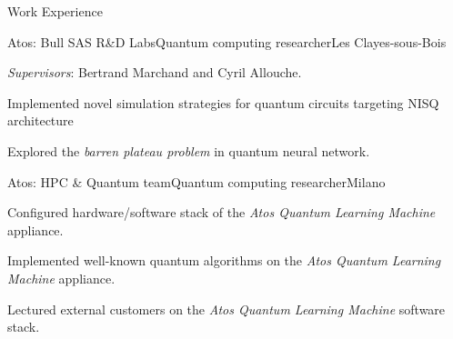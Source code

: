 \documentclass[
	a4paper, %
	11pt, %
]{tresume} %
\begin{document}
\begin{tSection}{Work Experience}
  \begin{tSubsection}{Atos: Bull SAS R\&D Labs}{\origdate{}}{Quantum computing researcher}{Les Clayes-sous-Bois}
  \item \emph{Supervisors}: Bertrand Marchand and Cyril Allouche.
  \item Implemented novel simulation strategies for quantum circuits targeting
    NISQ architecture
  \item Explored the \emph{barren plateau problem} in quantum neural network.
  \end{tSubsection}

  \begin{tSubsection}{Atos: HPC \& Quantum team}{\origdate{}}{Quantum computing researcher}{Milano}
  \item Configured hardware/software stack of the \textit{Atos Quantum Learning Machine} appliance.
  \item Implemented well-known quantum algorithms on the \textit{Atos Quantum
      Learning Machine} appliance.
  \item Lectured external customers on the \textit{Atos Quantum Learning Machine} software stack.
\end{tSubsection}
\end{tSection}
\end{document}
